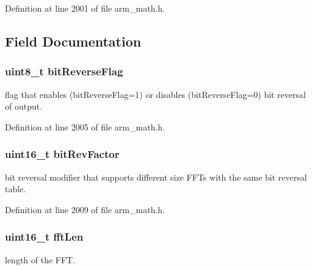 Definition at line 2001 of file arm\+\_\+math.\+h.



\subsection{Field Documentation}
\subsubsection[{\texorpdfstring{bit\+Reverse\+Flag}{bitReverseFlag}}]{\setlength{\rightskip}{0pt plus 5cm}uint8\+\_\+t bit\+Reverse\+Flag}\hypertarget{structarm__cfft__radix2__instance__q31_a09a221a818c6d0e064557a99e2fe9a8b}{}\label{structarm__cfft__radix2__instance__q31_a09a221a818c6d0e064557a99e2fe9a8b}
flag that enables (bit\+Reverse\+Flag=1) or disables (bit\+Reverse\+Flag=0) bit reversal of output. 

Definition at line 2005 of file arm\+\_\+math.\+h.

\subsubsection[{\texorpdfstring{bit\+Rev\+Factor}{bitRevFactor}}]{\setlength{\rightskip}{0pt plus 5cm}uint16\+\_\+t bit\+Rev\+Factor}\hypertarget{structarm__cfft__radix2__instance__q31_a33386d95319dc3ee7097b3a8e52e01ec}{}\label{structarm__cfft__radix2__instance__q31_a33386d95319dc3ee7097b3a8e52e01ec}
bit reversal modifier that supports different size F\+F\+Ts with the same bit reversal table. 

Definition at line 2009 of file arm\+\_\+math.\+h.

\subsubsection[{\texorpdfstring{fft\+Len}{fftLen}}]{\setlength{\rightskip}{0pt plus 5cm}uint16\+\_\+t fft\+Len}\hypertarget{structarm__cfft__radix2__instance__q31_ab8db3bbe7c61e6bb8ca2a55e3446e11a}{}\label{structarm__cfft__radix2__instance__q31_ab8db3bbe7c61e6bb8ca2a55e3446e11a}
length of the F\+FT. 

